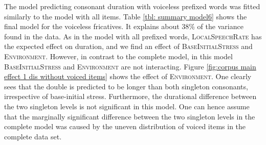  
\begin{table}[b!]
	\caption{ Summary of linear model for variables predicting the Box-Cox-transformed duration of [s] in prefixed words with voiceless /s/}
	\label{tbl: summary model6}
	
	
\end{table}

The model predicting consonant duration with voiceless prefixed words was fitted similarly to the model with all items. 
Table \ref{tbl: summary model6} shows the final model for the voiceless fricatives. It explains about 38\% of the variance found in the data. 
As in the model with all prefixed words, \textsc{LocalSpeechRate} has the expected effect on duration, and we find an effect of \textsc{BaseInitialStress} and \textsc{Environment}. However, in contrast to the complete model, in this model \textsc{BaseInitialStress} and \textsc{Environment} are not interacting. 
Figure \ref{fig:corpus main effect 1 dis without voiced items} shows the effect of  \textsc{Environment}. One clearly sees that the double is predicted to be longer than both singleton consonants, irrespective of base-initial stress. Furthermore, the durational difference between the two singleton levels is not significant in this model. One can hence assume that the marginally significant difference between the two singleton levels in the complete model was caused by the uneven distribution of voiced items in the complete data set. 


